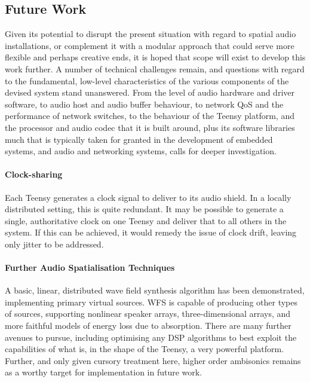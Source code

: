 \subsection{Future Work}\label{subsec:future-work}

Given its potential to disrupt the present situation with regard to spatial
audio installations, or complement it with a modular approach that could serve
more flexible and perhaps creative ends, it is hoped that scope will exist to
develop this work further.
A number of technical challenges remain, and questions with regard to the
fundamental, low-level characteristics of the various components of the devised
system stand unanswered.
From the level of audio hardware and driver software, to audio host and audio
buffer behaviour, to network QoS and the performance of network switches, to
the behaviour of the Teensy platform, and the processor and audio codec that it
is built around, plus its software libraries \textemdash{} much that is
typically taken for granted in the development of embedded systems, and audio
and networking systems, calls for deeper investigation.

\paragraph{Clock-sharing}
Each Teensy generates a clock signal to deliver to its audio shield.
In a locally distributed setting, this is quite redundant.
It may be possible to generate a single, authoritative clock on one Teensy
and deliver that to all others in the system.
If this can be achieved, it would remedy the issue of clock drift, leaving
only jitter to be addressed.

\paragraph{Further Audio Spatialisation Techniques}
A basic, linear, distributed wave field synthesis algorithm has been
demonstrated, implementing primary virtual sources.
WFS is capable of producing other types of sources, supporting nonlinear
speaker arrays, three-dimensional arrays, and more faithful models of
energy loss due to absorption.
There are many further avenues to pursue, including optimising any DSP
algorithms to best exploit the capabilities of what is, in the shape of the
Teensy, a very powerful platform.
Further, and only given cursory treatment here, higher order ambisonics remains
as a worthy target for implementation in future work.
